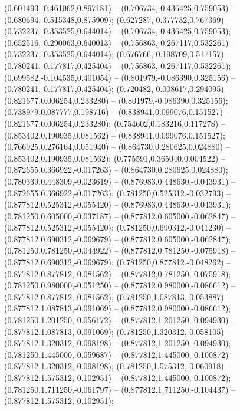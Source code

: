  (0.601493,-0.461062,0.897181) -- (0.706734,-0.436425,0.759053) -- (0.680694,-0.515348,0.875909);
 (0.627287,-0.377732,0.767369) -- (0.732237,-0.353525,0.644014) -- (0.706734,-0.436425,0.759053);
 (0.652516,-0.290063,0.640013) -- (0.756863,-0.267117,0.532261) -- (0.732237,-0.353525,0.644014);
 (0.676766,-0.198709,0.517157) -- (0.780241,-0.177817,0.425404) -- (0.756863,-0.267117,0.532261);
 (0.699582,-0.104535,0.401054) -- (0.801979,-0.086390,0.325156) -- (0.780241,-0.177817,0.425404);
 (0.720482,-0.008617,0.294095) -- (0.821677,0.006254,0.233280) -- (0.801979,-0.086390,0.325156);
 (0.738979,0.087777,0.198716) -- (0.838941,0.099076,0.151527) -- (0.821677,0.006254,0.233280);
 (0.754602,0.183216,0.117278) -- (0.853402,0.190935,0.081562) -- (0.838941,0.099076,0.151527);
 (0.766925,0.276164,0.051940) -- (0.864730,0.280625,0.024880) -- (0.853402,0.190935,0.081562);
 (0.775591,0.365040,0.004522) -- (0.872655,0.366922,-0.017263) -- (0.864730,0.280625,0.024880);
 (0.780339,0.448309,-0.023619) -- (0.876983,0.448630,-0.043931) -- (0.872655,0.366922,-0.017263);
 (0.781250,0.525312,-0.032793) -- (0.877812,0.525312,-0.055420) -- (0.876983,0.448630,-0.043931);
 (0.781250,0.605000,-0.037187) -- (0.877812,0.605000,-0.062847) -- (0.877812,0.525312,-0.055420);
 (0.781250,0.690312,-0.041230) -- (0.877812,0.690312,-0.069679) -- (0.877812,0.605000,-0.062847);
 (0.781250,0.781250,-0.044922) -- (0.877812,0.781250,-0.075918) -- (0.877812,0.690312,-0.069679);
 (0.781250,0.877812,-0.048262) -- (0.877812,0.877812,-0.081562) -- (0.877812,0.781250,-0.075918);
 (0.781250,0.980000,-0.051250) -- (0.877812,0.980000,-0.086612) -- (0.877812,0.877812,-0.081562);
 (0.781250,1.087813,-0.053887) -- (0.877812,1.087813,-0.091069) -- (0.877812,0.980000,-0.086612);
 (0.781250,1.201250,-0.056172) -- (0.877812,1.201250,-0.094930) -- (0.877812,1.087813,-0.091069);
 (0.781250,1.320312,-0.058105) -- (0.877812,1.320312,-0.098198) -- (0.877812,1.201250,-0.094930);
 (0.781250,1.445000,-0.059687) -- (0.877812,1.445000,-0.100872) -- (0.877812,1.320312,-0.098198);
 (0.781250,1.575312,-0.060918) -- (0.877812,1.575312,-0.102951) -- (0.877812,1.445000,-0.100872);
 (0.781250,1.711250,-0.061797) -- (0.877812,1.711250,-0.104437) -- (0.877812,1.575312,-0.102951);
